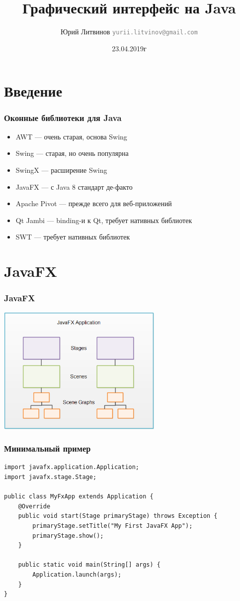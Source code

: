 \documentclass[xetex,mathserif,serif]{beamer}
\title{Графический интерфейс на Java}
\author[Юрий Литвинов]{Юрий Литвинов \newline \textcolor{gray}{\small\texttt{yurii.litvinov@gmail.com}}}
\date{23.04.2019г}
\begin{document}
	
	\frame{\titlepage}
	
	\section{Введение}

	\begin{frame}
		\frametitle{Оконные библиотеки для Java}
		\begin{itemize}
			\item AWT --- очень старая, основа Swing
			\item Swing --- старая, но очень популярна
			\item SwingX --- расширение Swing
			\item JavaFX --- с Java 8 стандарт де-факто
			\item Apache Pivot --- прежде всего для веб-приложений
			\item Qt Jambi --- binding-и к Qt, требует нативных библиотек
			\item SWT --- требует нативных библиотек
		\end{itemize}
	\end{frame}

	\section{JavaFX}

	\begin{frame}
		\frametitle{JavaFX}
		\begin{center}
			\includegraphics[width=0.6\textwidth]{javaFxOverview.png}
		\end{center}
	\end{frame}

	\begin{frame}[fragile]
		\frametitle{Минимальный пример}
		\begin{verbatim}
import javafx.application.Application;
import javafx.stage.Stage;

public class MyFxApp extends Application {
    @Override
    public void start(Stage primaryStage) throws Exception {
        primaryStage.setTitle("My First JavaFX App");
        primaryStage.show();
    }
    
    public static void main(String[] args) {
        Application.launch(args);
    }
}
		\end{verbatim}
\end{frame}
\end{document}
